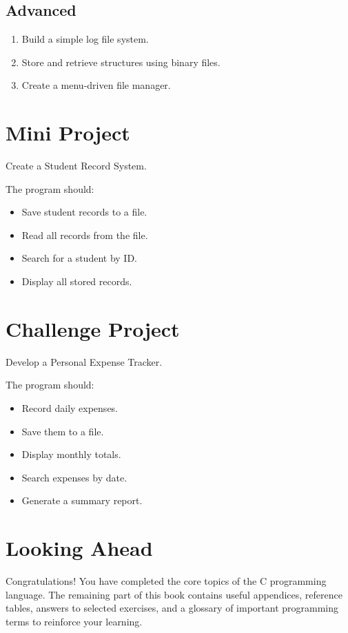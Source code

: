 \documentclass[12pt,openany]{book}
\begin{document}
\subsection*{Advanced}

\begin{enumerate}
    \item Build a simple log file system.
    \item Store and retrieve structures using binary files.
    \item Create a menu-driven file manager.
\end{enumerate}

\section{Mini Project}

Create a Student Record System.

The program should:

\begin{itemize}
    \item Save student records to a file.
    \item Read all records from the file.
    \item Search for a student by ID.
    \item Display all stored records.
\end{itemize}

\section{Challenge Project}

Develop a Personal Expense Tracker.

The program should:

\begin{itemize}
    \item Record daily expenses.
    \item Save them to a file.
    \item Display monthly totals.
    \item Search expenses by date.
    \item Generate a summary report.
\end{itemize}

\section{Looking Ahead}

Congratulations! You have completed the core topics of the C programming language. The remaining part of this book contains useful appendices, reference tables, answers to selected exercises, and a glossary of important programming terms to reinforce your learning.
\end{document}
